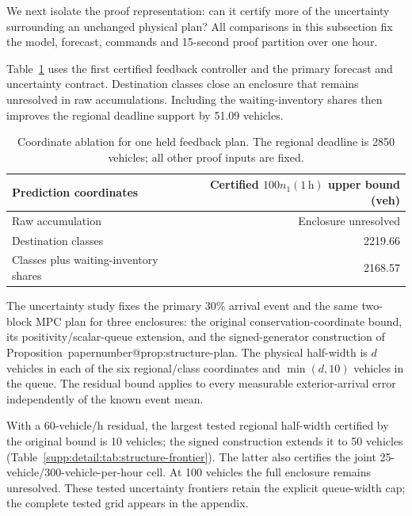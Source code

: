\documentclass[preprint,12pt]{elsarticle}
\makeatletter
\numberwithin{equation}{section}
\newcommand{\papernumber}[1]{\csname papernumber@#1\endcsname}
\makeatother
\begin{document}
We next isolate the proof representation: can it certify more
of the uncertainty surrounding an unchanged physical plan? All comparisons
in this subsection fix the model, forecast, commands and 15-second proof
partition over one hour.

Table~\ref{tab:new-coordinate-ablation} uses the first certified feedback
controller and the primary forecast and uncertainty contract. Destination
classes close an enclosure that remains unresolved in raw accumulations.
Including the waiting-inventory shares then improves the regional deadline
support by 51.09 vehicles.

\begin{table}[t]
\centering
\caption{Coordinate ablation for one held feedback plan. The regional
deadline is 2850 vehicles; all other proof inputs are fixed.}
\label{tab:new-coordinate-ablation}
\small
\begin{tabular}{@{}lr@{}}
\toprule
Prediction coordinates & Certified $100n_1(1\,\mathrm h)$ upper bound (veh)\\
\midrule
Raw accumulation & Enclosure unresolved\\
Destination classes & 2219.66\\
Classes plus waiting-inventory shares & 2168.57\\
\bottomrule
\end{tabular}
\end{table}

The uncertainty study fixes the primary 30\% arrival event and the same
two-block MPC plan for three enclosures: the original conservation-coordinate
bound, its positivity/scalar-queue extension, and the signed-generator
construction of Proposition~\papernumber{prop:structure-plan}. The physical
half-width is $d$ vehicles in each of the six regional/class coordinates
and $\min(d,10)$ vehicles in the queue. The residual bound applies to every
measurable exterior-arrival error independently of the known event mean.

With a 60-vehicle/h residual, the largest tested regional half-width
certified by the original bound is 10 vehicles; the signed construction
extends it to 50 vehicles (Table~\ref{supp:detail:tab:structure-frontier}). The latter
also certifies the joint 25-vehicle/300-vehicle-per-hour cell. At 100
vehicles the full enclosure remains unresolved. These tested uncertainty
frontiers retain the explicit queue-width cap; the complete tested grid appears in the appendix.
\end{document}
